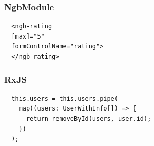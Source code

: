 \subsubsection{NgbModule}
\begin{lstlisting}
  <ngb-rating 
  [max]="5"
  formControlName="rating">
  </ngb-rating>
\end{lstlisting}

\subsubsection{RxJS}
\begin{lstlisting}
  this.users = this.users.pipe(
    map((users: UserWithInfo[]) => {
      return removeById(users, user.id);
    })
  );
\end{lstlisting}
